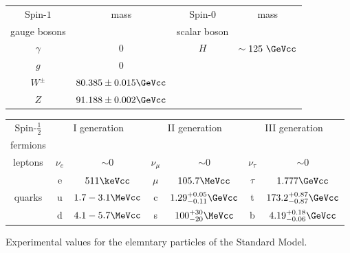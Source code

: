 
    \begin{tabular}{cccc}\toprule
      Spin-$1$ & \multirow{2}{*}{mass} & Spin-0 & \multirow{2}{*}{mass}\\
      gauge bosons & & scalar boson & \\\midrule
    $\gamma$      & 0  & \multirow{4}{*}{$H$} & \multirow{4}{*}{$\sim 125~\GeVcc$}                        \\
    $g$           & 0  & &                        \\
    $W^{\pm}$ & $ 80.385 \pm 0.015 \GeVcc$ & &\\
    $Z$       & $ 91.188 \pm 0.002 \GeVcc$ & &\\\bottomrule
    \end{tabular}

    \begin{tabular}{ccccccc}\toprule
      Spin-$\tfrac{1}{2}$ &  \multicolumn{2}{c}{\multirow{2}{*}{I generation}}
      &  \multicolumn{2}{c}{\multirow{2}{*}{II generation}}
      &  \multicolumn{2}{c}{\multirow{2}{*}{III generation}}\\
      fermions & & & & & \\\midrule
    \multirow{2}{*}{leptons} &
    $\nu_{e}$   & \small{$\sim 0$} &  
    $\nu_{\mu}$ & \small{$\sim 0$} &  
    $\nu_{\tau}$ & \small{$\sim 0$} \\
    &
    e            & \small{$511\keVcc$}   &  
    $\mu$ & \small{$105.7\MeVcc$} &  
    $\tau$     & \small{$1.777\GeVcc$} \\
    \multirow{2}{*}{quarks} &
    u & \small{$1.7-3.1\MeVcc$}         &  
    c & \small{$1.29^{+0.05}_{-0.11}\GeVcc$}  &  
    t & \small{$173.2^{+0.87}_{-0.87}\GeVcc$}\\ %
    &
    d & \small{$4.1-5.7\MeVcc$} &  
    s & \small{$100^{+30}_{-20}\MeVcc$} &  
    b & \small{$4.19^{+0.18}_{-0.06}\GeVcc$} \\\bottomrule
    \end{tabular}
  \caption{Experimental values for the elemntary particles of the Standard Model.\label{tab:mass}}
